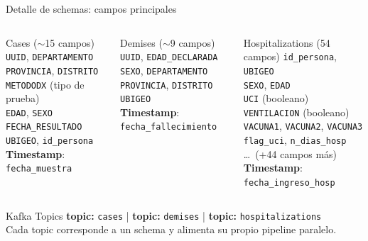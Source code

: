 \documentclass[aspectratio=169, 10pt]{beamer}
\begin{document}
\begin{frame}[shrink=8]{Detalle de schemas: campos principales}
  \begin{columns}[t]
      \begin{block}{\textcolor{unirdarkblue}{Cases} ($\sim$15 campos)}
        \scriptsize
        \texttt{UUID}, \texttt{DEPARTAMENTO}\\
        \texttt{PROVINCIA}, \texttt{DISTRITO}\\
        \texttt{METODODX} (tipo de prueba)\\
        \texttt{EDAD}, \texttt{SEXO}\\
        \texttt{FECHA\_RESULTADO}\\
        \texttt{UBIGEO}, \texttt{id\_persona}\\[3pt]
        \textbf{Timestamp}: \texttt{fecha\_muestra}
      \end{block}
      \begin{block}{\textcolor{alertred}{Demises} ($\sim$9 campos)}
        \scriptsize
        \texttt{UUID}, \texttt{EDAD\_DECLARADA}\\
        \texttt{SEXO}, \texttt{DEPARTAMENTO}\\
        \texttt{PROVINCIA}, \texttt{DISTRITO}\\
        \texttt{UBIGEO}\\[3pt]
        \textbf{Timestamp}: \texttt{fecha\_fallecimiento}
      \end{block}
      \begin{block}{\textcolor{warningorange}{Hospitalizations} (54 campos)}
        \scriptsize
        \texttt{id\_persona}, \texttt{UBIGEO}\\
        \texttt{SEXO}, \texttt{EDAD}\\
        \texttt{UCI} (booleano)\\
        \texttt{VENTILACION} (booleano)\\
        \texttt{VACUNA1}, \texttt{VACUNA2}, \texttt{VACUNA3}\\
        \texttt{flag\_uci}, \texttt{n\_dias\_hosp}\\
        \ldots\ (+44 campos m\'as)\\[3pt]
        \textbf{Timestamp}: \texttt{fecha\_ingreso\_hosp}
      \end{block}
  \end{columns}
  \vspace{6pt}
  \begin{exampleblock}{Kafka Topics}
    \centering\small
    \textbf{topic:} \texttt{cases} \quad|\quad
    \textbf{topic:} \texttt{demises} \quad|\quad
    \textbf{topic:} \texttt{hospitalizations}\\[2pt]
    Cada topic corresponde a un schema y alimenta su propio pipeline paralelo.
  \end{exampleblock}
\end{frame}
\end{document}
